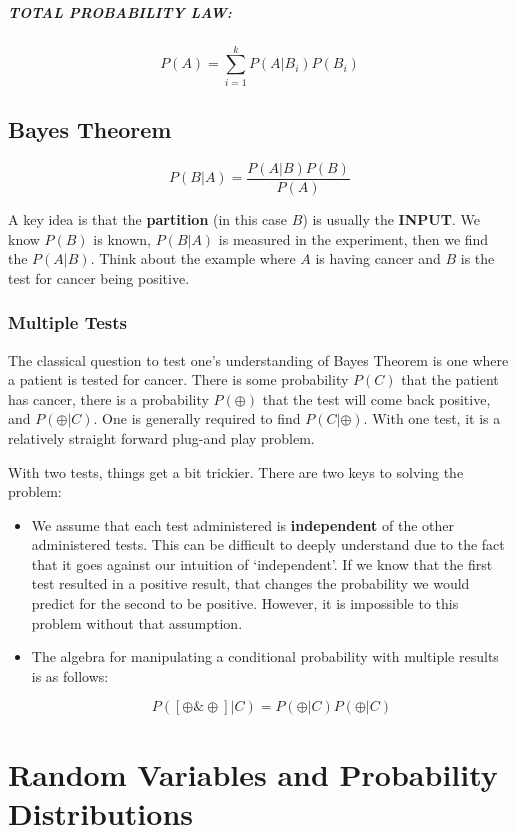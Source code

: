 \documentclass[a4paper,12pt]{report}
\begin{document}
\paragraph{TOTAL PROBABILITY LAW: } $$P(A) = \sum_{i=1}^k P(A|B_i)P(B_i)$$

\section{Bayes Theorem}

$$P(B | A) = \frac{P(A|B) P(B) }{P(A)}$$

A key idea is that the \textbf{partition} (in this case $B$) is usually the \textbf{INPUT}. 
We know $P(B)$ is known, $P(B|A)$ is measured in the experiment, then we find the $P(A|B)$. 
Think about the example where $A$ is having cancer and $B$ is the test for cancer being positive.


\subsection{Multiple Tests}

The classical question to test one's understanding of Bayes Theorem is one where a patient is tested for cancer. There is some probability $P(C)$ that the patient has cancer, there is a probability $P(\oplus)$ that the test will come back positive, and $P(\oplus | C)$. One is generally required to find $P(C | \oplus)$. With one test, it is a relatively straight forward plug-and play problem.

With two tests, things get a bit trickier. There are two keys to solving the problem:

\begin{itemize}
\item We assume that each test administered is \textbf{independent} of the other administered tests. This can be difficult to deeply understand due to the fact that it goes against our intuition of `independent'. If we know that the first test resulted in a positive result, that changes the probability we would predict for the second to be positive. However, it is impossible to this problem without that assumption.
\item The algebra for manipulating a conditional probability with multiple results is as follows:

$$P([\oplus \& \oplus] | C) = P(\oplus | C)P(\oplus | C)$$
\end{itemize}




\chapter{Random Variables and Probability Distributions}
\end{document}
